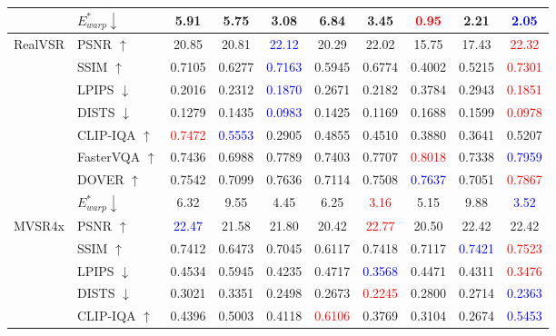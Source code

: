 \documentclass{article}
\begin{document}
\begin{table}[t]
{\begin{tabular}{l|l|c|c||c|c|c|c|c|c}
                & $E^*_{warp} \downarrow$ & 5.91   & 5.75   & 3.08   & 6.84   & 3.45   & \textcolor{red}{0.95}   & 2.21 & \textcolor{blue}{2.05} \\
            \midrule
            \multirow{8}{*}{RealVSR}
                & PSNR $\uparrow$         & 20.85 & 20.81 & \textcolor{blue}{22.12} & 20.29 & 22.02 & 15.75 & 17.43 & \textcolor{red}{22.32} \\
                & SSIM $\uparrow$         & 0.7105 & 0.6277 & \textcolor{blue}{0.7163} & 0.5945 & 0.6774 & 0.4002 & 0.5215 & \textcolor{red}{0.7301} \\
                & LPIPS $\downarrow$      & 0.2016 & 0.2312 & \textcolor{blue}{0.1870} & 0.2671 & 0.2182 & 0.3784 & 0.2943 & \textcolor{red}{0.1851} \\
                & DISTS $\downarrow$      & 0.1279 & 0.1435 & \textcolor{blue}{0.0983} & 0.1425 & 0.1169 & 0.1688 & 0.1599 & \textcolor{red}{0.0978} \\
                & CLIP-IQA $\uparrow$     & \textcolor{red}{0.7472} & \textcolor{blue}{0.5553} & 0.2905 & 0.4855 & 0.4510 & 0.3880 & 0.3641 & 0.5207 \\
                & FasterVQA $\uparrow$    & 0.7436 & 0.6988 & 0.7789 & 0.7403 &0.7707 & \textcolor{red}{0.8018} & 0.7338     & \textcolor{blue}{0.7959} \\
                & DOVER $\uparrow$        & 0.7542 & 0.7099 & 0.7636 & 0.7114 & 0.7508 & \textcolor{blue}{0.7637} & 0.7051 & \textcolor{red}{0.7867} \\
                & $E^*_{warp} \downarrow$ & 6.32   & 9.55   & 4.45   & 6.25   & \textcolor{red}{3.16} & 5.15  & 9.88  & \textcolor{blue}{3.52} \\
            \midrule
            \multirow{8}{*}{MVSR4x}
                & PSNR $\uparrow$         & \textcolor{blue}{22.47} & 21.58 & 21.80 & 20.42 & \textcolor{red}{22.77} & 20.50 & 22.42 & 22.42 \\
                & SSIM $\uparrow$         & 0.7412 & 0.6473 & 0.7045 & 0.6117 & 0.7418  & 0.7117 & \textcolor{blue}{0.7421} & \textcolor{red}{0.7523} \\
                & LPIPS $\downarrow$      & 0.4534 & 0.5945 & 0.4235 & 0.4717 & \textcolor{blue}{0.3568} & 0.4471 & 0.4311 & \textcolor{red}{0.3476} \\
                & DISTS $\downarrow$      & 0.3021 & 0.3351 & 0.2498 & 0.2673 & \textcolor{red}{0.2245} & 0.2800 & 0.2714 & \textcolor{blue}{0.2363} \\
                & CLIP-IQA $\uparrow$     & 0.4396 & 0.5003 & 0.4118 & \textcolor{red}{0.6106} & 0.3769 & 0.3104 & 0.2674 & \textcolor{blue}{0.5453} \\

\end{tabular}}
\end{table}
\end{document}
